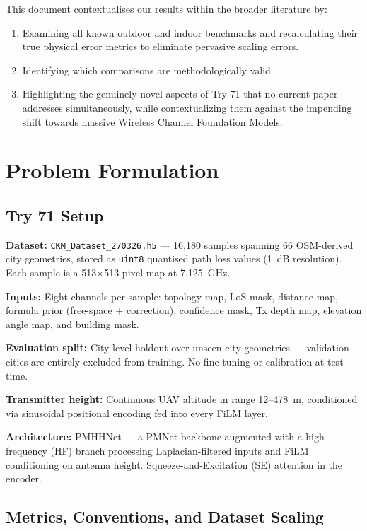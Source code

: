 \documentclass[11pt,a4paper]{article}
\begin{document}
This document contextualises our results within the broader literature by:
\begin{enumerate}[nosep]
    \item Examining all known outdoor and indoor benchmarks and recalculating their true physical error metrics to eliminate pervasive scaling errors.
    \item Identifying which comparisons are methodologically valid.
    \item Highlighting the genuinely novel aspects of Try 71 that no current paper addresses simultaneously, while contextualizing them against the impending shift towards massive Wireless Channel Foundation Models.
\end{enumerate}

\section{Problem Formulation}
\label{sec:problem}

\subsection{Try 71 Setup}

\textbf{Dataset:} \texttt{CKM\_Dataset\_270326.h5} — 16,180 samples spanning 66
OSM-derived city geometries, stored as \texttt{uint8} quantised path loss values (1~dB
resolution). Each sample is a 513$\times$513 pixel map at 7.125~GHz.

\textbf{Inputs:} Eight channels per sample: topology map, LoS mask, distance map,
formula prior (free-space + correction), confidence mask, Tx depth map, elevation
angle map, and building mask.

\textbf{Evaluation split:} City-level holdout over unseen city geometries —
validation cities are entirely excluded from training. No fine-tuning or
calibration at test time.

\textbf{Transmitter height:} Continuous UAV altitude in range 12--478~m, conditioned
via sinusoidal positional encoding fed into every FiLM layer.

\textbf{Architecture:} PMHHNet — a PMNet backbone augmented with a high-frequency
(HF) branch processing Laplacian-filtered inputs and FiLM conditioning on antenna
height. Squeeze-and-Excitation (SE) attention in the encoder.

\subsection{Metrics, Conventions, and Dataset Scaling}
\end{document}
